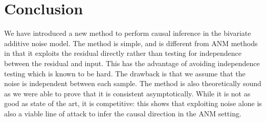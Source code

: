 \chapter{Conclusion}

We have introduced a new method to perform causal inference in the bivariate additive 
noise model. The method is simple, and is different from ANM methods in that it 
exploits the residual directly rather than testing for independence between 
the residual and input. This has the advantage of avoiding independence testing 
which is known to be hard. The drawback is that we assume that the noise is independent 
between each sample. The method is also theoretically sound as we were able to prove that 
it is consistent asymptotically. While it is not as good as state of the art, it is
competitive: this shows that exploiting noise alone is also a viable 
line of attack to infer the causal direction in the ANM setting. 













